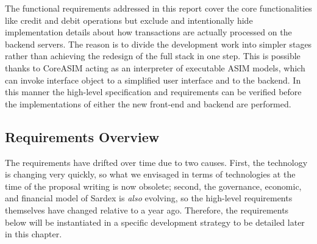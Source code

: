 The functional requirements addressed in this report cover the core functionalities like credit and debit operations but exclude and intentionally hide implementation details about how transactions are actually processed on the backend servers. The reason is to divide the development work into simpler stages rather than achieving the redesign of the full stack in one step. This is possible thanks to CoreASIM acting as an interpreter of executable ASIM models, which can invoke interface object to a simplified user interface and to the backend. In this manner the high-level specification and requirements can be verified before the implementations of either the new front-end and backend are performed.

\subsection{Requirements Overview}\label{_requirements_overview}
The requirements have drifted over time due to two causes. First, the technology is changing very quickly, so what we envisaged in terms of technologies at the time of the proposal writing is now obsolete; second, the governance, economic, and financial model of Sardex is \emph{also} evolving, so the high-level requirements themselves have changed relative to a year ago. Therefore, the requirements below will be instantiated in a specific development strategy to be detailed later in this chapter.
\setcounter{table}{0}
\setlength{\tabcolsep}{10pt}
